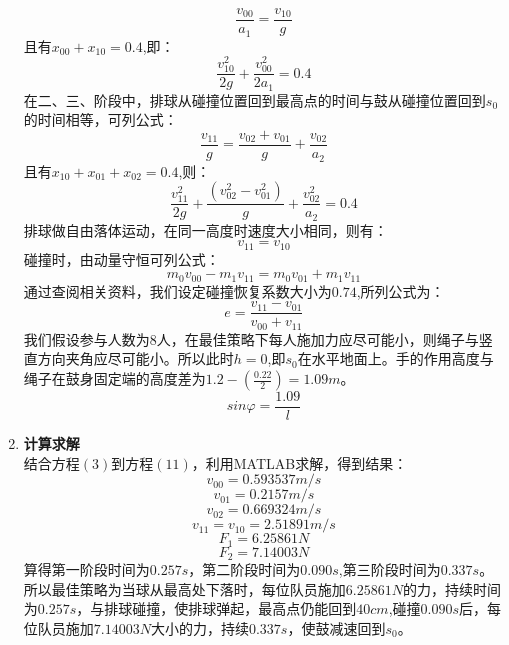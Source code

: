 \documentclass{cumcm}
\begin{document}
\begin{enumerate}
\begin{equation}
\frac{v_{00}}{a_1}=\frac{v_{10}}{g}
\end{equation}
且有$x_{00}+x_{10}=0.4$,即：
\begin{equation}
\frac{v^2_{10}}{2g}+\frac{v^2_{00}}{2a_1}=0.4
\end{equation}
在二、三、阶段中，排球从碰撞位置回到最高点的时间与鼓从碰撞位置回到$s_0$的时间相等，可列公式：
\begin{equation}
\frac{v_{11}}{g}=\frac{v_{02}+v_{01}}{g}+\frac{v_{02}}{a_2}
\end{equation}
且有$x_{10}+x_{01}+x_{02}=0.4$,则：
\begin{equation}
\frac{v^2_{11}}{2g}+\frac{(v^2_{02}-v^2_{01})}{g}+\frac{v^2_{02}}{a_2}=0.4
\end{equation}
排球做自由落体运动，在同一高度时速度大小相同，则有：
\begin{equation}
v_{11}=v_{10}
\end{equation}
碰撞时，由动量守恒可列公式：
\begin{equation}
m_0v_{00}-m_1v_{11}=m_0v_{01}+m_1v_{11}
\end{equation}
通过查阅相关资料，我们设定碰撞恢复系数大小为$0.74$,所列公式为：
\begin{equation}
e=\frac{v_{11}-v_{01}}{v_{00}+v_{11}}
\end{equation}
我们假设参与人数为$8$人，在最佳策略下每人施加力应尽可能小，则绳子与竖直方向夹角应尽可能小。所以此时$h=0$,即$s_0$在水平地面上。手的作用高度与绳子在鼓身固定端的高度差为$1.2-(\frac{0.22}{2})=1.09m$。
\begin{equation}
sin\varphi=\frac{1.09}{l}
\end{equation}
\item \textbf{计算求解}\\
结合方程$(3)$到方程$(11)$，利用MATLAB求解，得到结果：
$$v_{00}=0.593537m/s$$
$$v_{01}=0.2157m/s$$
$$v_{02}=0.669324m/s$$
$$v_{11}=v_{10}=2.51891m/s$$
$$F_1=6.25861N$$ 
$$F_2=7.14003N$$
\quad \quad
算得第一阶段时间为$0.257s$，第二阶段时间为$0.090s$,第三阶段时间为$0.337s$。
所以最佳策略为当球从最高处下落时，每位队员施加$6.25861N$的力，持续时间为$0.257s$，与排球碰撞，使排球弹起，最高点仍能回到$40cm$,碰撞$0.090s$后，每位队员施加$7.14003N$大小的力，持续$0.337s$，使鼓减速回到$s_0$。

\end{enumerate}
\end{document}
